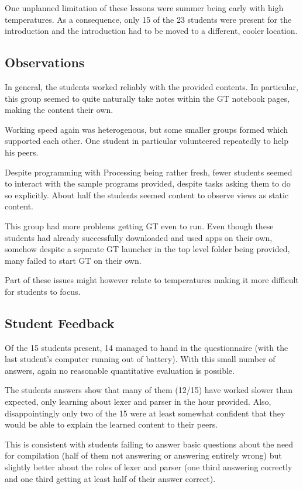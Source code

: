 One unplanned limitation of these lessons were summer being early with high temperatures. As a consequence, only 15 of the 23 students were present for the introduction and the introduction had to be moved to a different, cooler location.


\subsection{Observations}

In general, the students worked reliably with the provided contents. In particular, this group seemed to quite naturally take notes within the GT notebook pages, making the content their own.

Working speed again was heterogenous, but some smaller groups formed which supported each other. One student in particular volunteered repeatedly to help his peers.

Despite programming with Processing being rather fresh, fewer students seemed to interact with the sample programs provided, despite tasks asking them to do so explicitly. About half the students seemed content to observe views as static content.

This group had more problems getting GT even to run. Even though these students had already successfully downloaded and used apps on their own, somehow despite a separate GT launcher in the top level folder being provided, many failed to start GT on their own.

Part of these issues might however relate to temperatures making it more difficult for students to focus.


\subsection{Student Feedback}

Of the 15 students present, 14 managed to hand in the questionnaire (with the last student's computer running out of battery). With this small number of answers, again no reasonable quantitative evaluation is possible.

The students answers show that many of them (12/15) have worked slower than expected, only learning about lexer and parser in the hour provided. Also, disappointingly only two of the 15 were at least somewhat confident that they would be able to explain the learned content to their peers.

This is consistent with students failing to answer basic questions about the need for compilation (half of them not answering or answering entirely wrong) but slightly better about the roles of lexer and parser (one third answering correctly and one third getting at least half of their answer correct).

